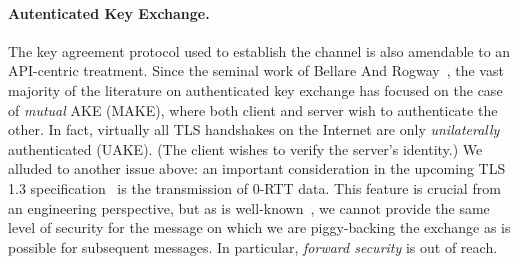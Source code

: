 \fi
%

\paragraph{Autenticated Key Exchange. }
The key agreement protocol used to establish the channel is also amendable to an
API-centric treatment.
%
Since the seminal work of Bellare And Rogway~\cite{BR93}, the vast majority of
the literature on authenticated key exchange has focused on the case of
\emph{mutual} AKE (MAKE), where both client and server wish to authenticate the
other. In fact, virtually all TLS handshakes on the Internet are only
\emph{unilaterally} authenticated (UAKE). (The client wishes to verify the
server's identity.)
%
\fi
%
We alluded to another issue above: an important consideration in the upcoming TLS 1.3
specification~\cite{tls13} is the transmission of 0-RTT data.
%
This feature is crucial from an engineering perspective, but as is
well-known~\cite[Section 2.2]{tls13}, we cannot provide the same level of
security for the message on which we are piggy-backing the exchange as is
possible for subsequent messages. In particular, \emph{forward security} is out
of reach.


